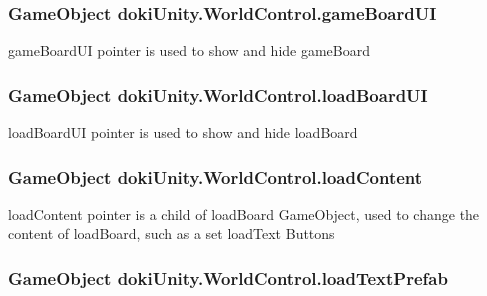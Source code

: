 \subsubsection[{\texorpdfstring{game\+Board\+UI}{gameBoardUI}}]{\setlength{\rightskip}{0pt plus 5cm}Game\+Object doki\+Unity.\+World\+Control.\+game\+Board\+UI}\hypertarget{classdoki_unity_1_1_world_control_ae8c5b33906c63ababdf909c53fb9065f}{}\label{classdoki_unity_1_1_world_control_ae8c5b33906c63ababdf909c53fb9065f}


game\+Board\+UI pointer is used to show and hide game\+Board 

\subsubsection[{\texorpdfstring{load\+Board\+UI}{loadBoardUI}}]{\setlength{\rightskip}{0pt plus 5cm}Game\+Object doki\+Unity.\+World\+Control.\+load\+Board\+UI}\hypertarget{classdoki_unity_1_1_world_control_a1acfce34bd2ad676c0f4e8e0aaf4321b}{}\label{classdoki_unity_1_1_world_control_a1acfce34bd2ad676c0f4e8e0aaf4321b}


load\+Board\+UI pointer is used to show and hide load\+Board 

\subsubsection[{\texorpdfstring{load\+Content}{loadContent}}]{\setlength{\rightskip}{0pt plus 5cm}Game\+Object doki\+Unity.\+World\+Control.\+load\+Content}\hypertarget{classdoki_unity_1_1_world_control_ad1c77f4fac85bf16c963907cf2fe1b1a}{}\label{classdoki_unity_1_1_world_control_ad1c77f4fac85bf16c963907cf2fe1b1a}


load\+Content pointer is a child of load\+Board Game\+Object, used to change the content of load\+Board, such as a set load\+Text Buttons 

\subsubsection[{\texorpdfstring{load\+Text\+Prefab}{loadTextPrefab}}]{\setlength{\rightskip}{0pt plus 5cm}Game\+Object doki\+Unity.\+World\+Control.\+load\+Text\+Prefab}\hypertarget{classdoki_unity_1_1_world_control_a8b463cfe781120e636a40d52df4dcd7b}{}\label{classdoki_unity_1_1_world_control_a8b463cfe781120e636a40d52df4dcd7b}


